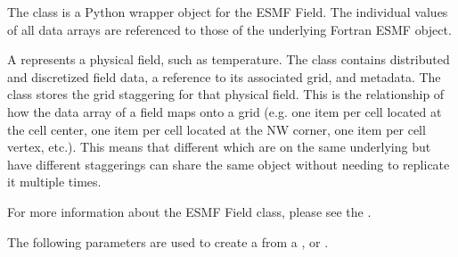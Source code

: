 \documentclass[letterpaper,10pt,english]{sphinxmanual}
\begin{document}
\begin{fulllineitems}
\label{\detokenize{field:ESMF.api.field.Field}}
The {\hyperref[\detokenize{field:ESMF.api.field.Field}]{}} class is a Python wrapper object for the ESMF Field.
The individual values of all data arrays are referenced to those of the
underlying Fortran ESMF object.

A {\hyperref[\detokenize{field:ESMF.api.field.Field}]{}} represents a physical field, such as temperature.   The {\hyperref[\detokenize{field:ESMF.api.field.Field}]{}} class
contains distributed and discretized field data, a reference to its
associated grid, and metadata. The {\hyperref[\detokenize{field:ESMF.api.field.Field}]{}} class stores the grid staggering
for that physical field. This is the relationship of how the data array of
a field maps onto a grid (e.g. one item per cell located at the cell center,
one item per cell located at the NW corner, one item per cell vertex, etc.).
This means that different {\hyperref[\detokenize{field:ESMF.api.field.Field}]{}} which are on the same underlying {\hyperref[\detokenize{grid:ESMF.api.grid.Grid}]{}} but
have different staggerings can share the same {\hyperref[\detokenize{grid:ESMF.api.grid.Grid}]{}} object without needing to
replicate it multiple times.

For more information about the ESMF Field class, please see the .

The following parameters are used to create a {\hyperref[\detokenize{field:ESMF.api.field.Field}]{}}
from a {\hyperref[\detokenize{grid:ESMF.api.grid.Grid}]{}}, {\hyperref[\detokenize{mesh:ESMF.api.mesh.Mesh}]{}} or
{\hyperref[\detokenize{locstream:ESMF.api.locstream.LocStream}]{}}.


\end{fulllineitems}
\end{document}
